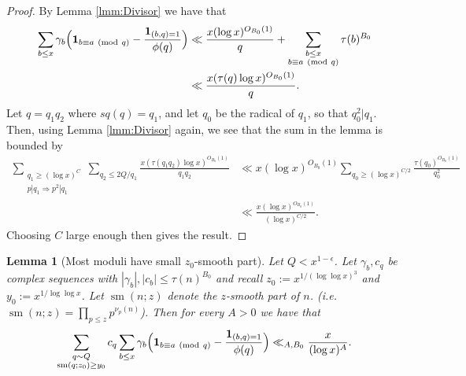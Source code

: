 \documentclass[10pt]{amsart}
\theoremstyle{plain}
\newtheorem{lmm}[thrm]{Lemma}
\numberwithin{equation}{section}
\newcommand{\Mod}[1]{\ (\mathrm{mod}\ #1)}
\begin{document}
\begin{proof}
By Lemma \ref{lmm:Divisor} we have that
\begin{align*}
\sum_{b\le  x}\gamma_b\Bigl(\mathbf{1}_{b\equiv a\Mod{q}}-\frac{\mathbf{1}_{(b,q)=1}}{\phi(q)}\Bigr)&\ll \frac{x(\log{x})^{O_{B_0}(1)}}{q}+\sum_{\substack{b\le x\\ b\equiv a\Mod{q}}}\tau(b)^{B_0}\\
&\ll \frac{x(\tau(q)\log{x})^{O_{B_0}(1)}}{q}.
\end{align*}
Let $q=q_1 q_2$ where $sq(q)=q_1$, and let $q_0$ be the radical of $q_1$, so that $q_0^2|q_1$. Then, using Lemma \ref{lmm:Divisor} again, we see that the sum in the lemma is bounded by
\begin{align*}
\sum_{\substack{q_1\ge (\log{x})^C\\ p|q_1\Rightarrow p^2|q_1}}\sum_{q_2\le 2Q/q_1}\frac{x(\tau(q_1q_2)\log{x})^{O_{B_0}(1)}}{q_1q_2}&\ll x(\log{x})^{O_{B_0}(1)}\sum_{q_0\ge (\log{x})^{C/2}}\frac{\tau(q_0)^{O_{B_0}(1)}}{q_0^2}\\
&\ll \frac{x(\log{x})^{O_{B_0}(1)}}{(\log{x})^{C/2}}.
\end{align*}
Choosing $C$ large enough then gives the result.
\end{proof}
%
%
%
%
%
%
%
%
\begin{lmm}[Most moduli have small $z_0$-smooth part]\label{lmm:RoughModuli}
Let $Q<x^{1-\epsilon}$. Let $\gamma_b,c_q$ be complex sequences with $|\gamma_b|,|c_b|\le \tau(n)^{B_0}$ and recall $z_0:=x^{1/(\log\log{x})^3}$ and $y_0:=x^{1/\log\log{x}}$. Let $\operatorname{sm}(n;z)$ denote the $z$-smooth part of $n$. (i.e. $\operatorname{sm}(n;z)=\prod_{p\le z}p^{\nu_p(n)}$). Then for every $A>0$ we have that
\[
\sum_{\substack{q\sim Q\\ \operatorname{sm}(q;z_0)\ge y_0}}c_q\sum_{b\le  x}\gamma_b\Bigl(\mathbf{1}_{b\equiv a\Mod{q}}-\frac{\mathbf{1}_{(b,q)=1}}{\phi(q)}\Bigr)\ll_{A,B_0} \frac{x}{(\log{x})^A}.
\]
\end{lmm}
%
%
%
%
\end{document}
